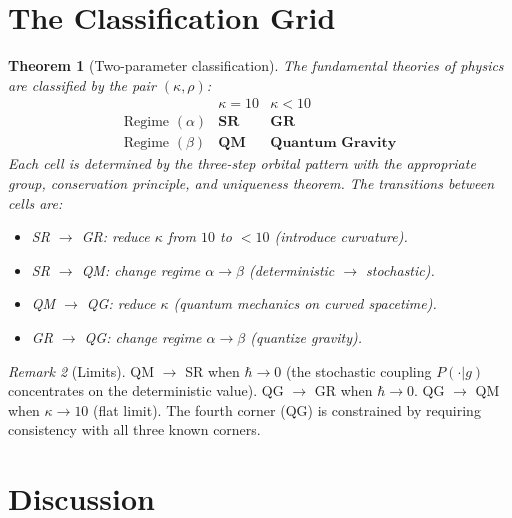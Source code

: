 \documentclass[12pt]{article}
\theoremstyle{plain}
\newtheorem{theorem}{Theorem}[section]
\theoremstyle{definition}
\theoremstyle{remark}
\newtheorem{remark}[theorem]{Remark}
\begin{document}
\section{The Classification Grid}
\label{sec:grid}

\begin{theorem}[Two-parameter classification]\label{thm:grid}
The fundamental theories of physics are classified by the pair $(\kappa, \rho)$:
\begin{equation}\label{eq:grid}
\begin{array}{c|cc}
& \kappa = 10 & \kappa < 10 \\ \hline
\text{Regime } (\alpha) & \textbf{SR} & \textbf{GR} \\[3pt]
\text{Regime } (\beta) & \textbf{QM} & \textbf{Quantum Gravity}
\end{array}
\end{equation}
Each cell is determined by the three-step orbital pattern with the appropriate group, conservation principle, and uniqueness theorem. The transitions between cells are:
\begin{itemize}
    \item SR $\to$ GR: reduce $\kappa$ from $10$ to $< 10$ (introduce curvature).
    \item SR $\to$ QM: change regime $\alpha \to \beta$ (deterministic $\to$ stochastic).
    \item QM $\to$ QG: reduce $\kappa$ (quantum mechanics on curved spacetime).
    \item GR $\to$ QG: change regime $\alpha \to \beta$ (quantize gravity).
\end{itemize}
\end{theorem}

\begin{remark}[Limits]
QM $\to$ SR when $\hbar \to 0$ (the stochastic coupling $P(\cdot|g)$ concentrates on the deterministic value). QG $\to$ GR when $\hbar \to 0$. QG $\to$ QM when $\kappa \to 10$ (flat limit). The fourth corner (QG) is constrained by requiring consistency with all three known corners.
\end{remark}


\section{Discussion}
\label{sec:discussion}
\end{document}
